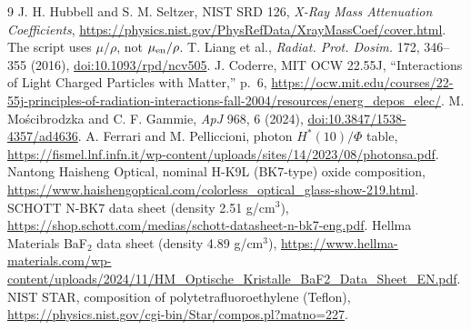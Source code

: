 \documentclass[10pt,a4paper]{article}
\begin{document}
\small
\begin{thebibliography}{9}
 J. H. Hubbell and S. M. Seltzer, NIST SRD 126, \emph{X-Ray Mass Attenuation Coefficients}, \url{https://physics.nist.gov/PhysRefData/XrayMassCoef/cover.html}. The script uses $\mu/\rho$, not $\mu_{\rm en}/\rho$.
 T. Liang et al., \emph{Radiat. Prot. Dosim.} 172, 346--355 (2016), \href{https://doi.org/10.1093/rpd/ncv505}{doi:10.1093/rpd/ncv505}.
 J. Coderre, MIT OCW 22.55J, ``Interactions of Light Charged Particles with Matter,'' p.~6, \url{https://ocw.mit.edu/courses/22-55j-principles-of-radiation-interactions-fall-2004/resources/energ_depos_elec/}.
 M. Mo\'scibrodzka and C. F. Gammie, \emph{ApJ} 968, 6 (2024), \href{https://doi.org/10.3847/1538-4357/ad4636}{doi:10.3847/1538-4357/ad4636}.
 A. Ferrari and M. Pelliccioni, photon $H^*(10)/\Phi$ table, \url{https://fismel.lnf.infn.it/wp-content/uploads/sites/14/2023/08/photonsa.pdf}.
 Nantong Haisheng Optical, nominal H-K9L (BK7-type) oxide composition, \url{https://www.haishengoptical.com/colorless_optical_glass-show-219.html}.
 SCHOTT N-BK7 data sheet (density 2.51 g/cm$^3$), \url{https://shop.schott.com/medias/schott-datasheet-n-bk7-eng.pdf}.
 Hellma Materials BaF$_2$ data sheet (density 4.89 g/cm$^3$), \url{https://www.hellma-materials.com/wp-content/uploads/2024/11/HM_Optische_Kristalle_BaF2_Data_Sheet_EN.pdf}.
 NIST STAR, composition of polytetrafluoroethylene (Teflon), \url{https://physics.nist.gov/cgi-bin/Star/compos.pl?matno=227}.
\end{thebibliography}
\normalsize

\appendix
\clearpage
\end{document}
